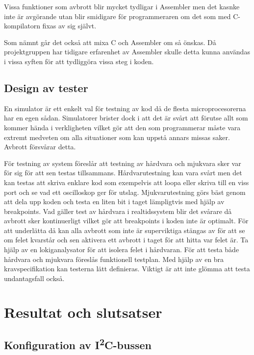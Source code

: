 \documentclass[11pt]{article}
\begin{document}
\begin{flushleft}
Vissa funktioner som avbrott blir mycket tydligar i Assembler men det kasnke inte är avgörande utan blir smidigare för programmeraren om det som med  C- kompilatorn fixas av sig självt. 

Som nämnt går det också att mixa C och Assembler om så önskas. Då projektgruppen har tidigare erfarenhet av Assembler skulle detta kunna användas i vissa syften för att tydliggöra vissa steg i koden. 

\subsection{Design av tester}
En simulator är ett enkelt val för testning av kod då de flesta microprocesorerna har en egen sådan. Simulatorer brister dock i att det är svårt att förutse allt som kommer hända i verkligheten vilket gör att den som programmerar måste vara extremt medveten om alla situationer som kan uppstå annars missas saker. Avbrott försvårar detta.\cite{RWD}

För testning av system föreslår \cite{RWD} att testning av hårdvara och mjukvara sker var för sig för att sen testas tillsammans. Hårdvarutestning kan vara svårt men det kan testas att skriva enklare kod som exempelvis att loopa eller skriva till en viss port och se vad ett oscilloskop ger för utslag. Mjukvarutestning görs bäst genom att dela upp koden och testa en liten bit i taget lämpligtvis med hjälp av breakpoints. Vad gäller test av hårdvara i realtidssystem blir det svårare då avbrott sker kontinuerligt vilket gör att breakpoints i koden inte är optimalt. För att underlätta då kan alla avbrott som inte är superviktiga stängas av för att se om felet kvarstår och sen aktivera ett avbrott i taget för att hitta var felet är. Ta hjälp av en lokiganalysator för att isolera felet i hårdvaran. För att testa både hårdvara och mjukvara föreslås funktionell testplan. Med hjälp av en bra kravspecifikation kan testerna lätt definieras. Viktigt är att inte glömma att testa undantagsfall också.

\pagebreak

\section{Resultat och slutsatser}

\subsection{Konfiguration av I\textsuperscript{2}C-bussen}


\end{flushleft}
\end{document}
